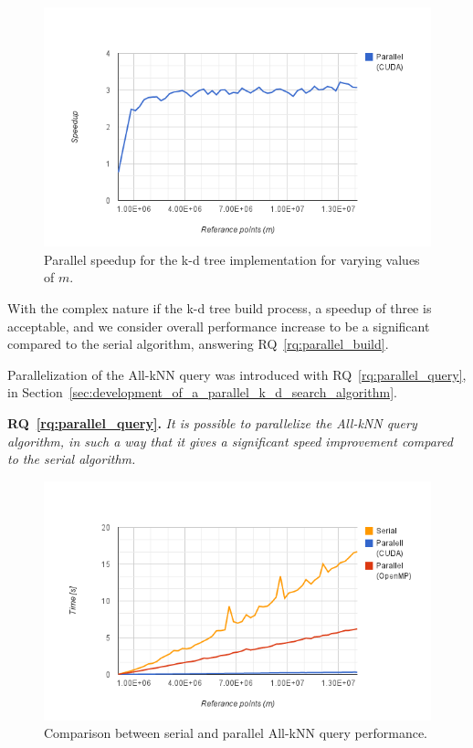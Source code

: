 \begin{figure}[ht!]
    \centering
    \includegraphics[width=120mm]{../gfx/final_tree_build_speedup.png}
    \caption{Parallel speedup for the k-d tree implementation for varying values of $m$.}
    \label{fig:final_tree_build_speedup}
\end{figure}

With the complex nature if the k-d tree build process, a speedup of three is acceptable, and we consider overall performance increase to be a significant compared to the serial algorithm, answering RQ~\ref{rq:parallel_build}. 

Parallelization of the All-kNN query was introduced with RQ~\ref{rq:parallel_query}, in Section~\ref{sec:development_of_a_parallel_k_d_search_algorithm}. 

\textbf{RQ~\ref{rq:parallel_query}.} \emph{It is possible to parallelize the All-kNN query algorithm, in such a way that it gives a significant speed improvement compared to the serial algorithm.}

\begin{figure}[ht!]
    \centering
    \includegraphics[width=120mm]{../gfx/final_kd_search.png}
    \caption{Comparison between serial and parallel All-kNN query performance.}
    \label{fig:final_kd_search}
\end{figure}

